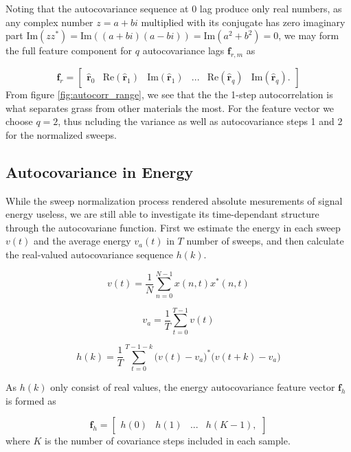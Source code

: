 Noting that the autocovariance sequence at 0 lag produce only real numbers, as any complex number $z = a + bi$ multiplied with its conjugate has zero imaginary part $\text{Im}(zz^*) = \text{Im}((a + bi)(a - bi)) = \text{Im}(a^2 + b^2) = 0$, we may form the full feature component for $q$ autocovariance lags $\mathbf{f}_{r,m}$ as

\begin{equation}
	\mathbf{f}_{r} = 
	\begin{bmatrix}
		\hat{\mathbf{r}}_{0}  & \text{Re}(\hat{\mathbf{r}}_{1} ) & \text{Im}(\hat{\mathbf{r}}_{1} ) & ... & \text{Re}(\hat{\mathbf{r}}_{q} ) & \text{Im}(\hat{\mathbf{r}}_{q} ).
	\end{bmatrix}
\end{equation}
From figure \ref{fig:autocorr_range}, we see that the the 1-step autocorrelation is what separates grass from other materials the most. For the feature vector we choose $q=2$, thus ncluding the variance as well as autocovariance steps 1 and 2 for the normalized sweeps.


\subsection{Autocovariance in Energy}

While the sweep normalization process rendered absolute mesurements of signal energy useless, we are still able to investigate its time-dependant structure through the autocovariane function. First we estimate the energy in each sweep $v(t)$ and the average energy $v_a(t)$ in $T$ number of sweeps, and then calculate the real-valued autocovariance sequence $h(k)$. 

\begin{equation}
	v(t) = \frac{1}{N}\sum_{n=0}^{N-1}x(n,t)x^*(n,t)
\end{equation}

\begin{equation} 
	v_a = \frac{1}{T}\sum_{t=0}^{T-1}v(t)
\end{equation}

\begin{equation}
	h(k) = \frac{1}{T}\sum_{t=0}^{T-1-k}\big(v(t) - v_a\big)^*\big(v(t+k) - v_a\big)
\end{equation}

As $h(k)$ only consist of real values, the energy autocovariance feature vector $\mathbf{f}_{h}$ is formed as

\begin{equation}
	\mathbf{f}_{h} = 
	\begin{bmatrix}
		h(0) & h(1) & ... & h(K-1),
	\end{bmatrix}
\end{equation}
where $K$ is the number of covariance steps included in each sample. 

